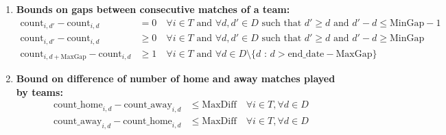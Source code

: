 \documentclass[a4paper, 12pt]{article}
\begin{document}
\begin{enumerate}
    \item \textbf{Bounds on gaps between consecutive matches of a team:}
    \begin{align*}
        \text{count}_{i,d'} - \text{count}_{i,d} &= 0 \quad \forall i \in T \text{ and } \forall d, d' \in D \text{ such that $d' \geq d$ and $d' - d \leq \text{MinGap}$} - 1 \\
        \text{count}_{i,d'} - \text{count}_{i,d} &\geq 0 \quad \forall i \in T \text{ and } \forall d, d' \in D \text{ such that $d' \geq d$ and $d' - d \geq \text{MinGap}$} \\
        \text{count}_{i,d+\text{MaxGap}} - \text{count}_{i,d} &\geq 1 \quad \forall i \in T \text{ and } \forall d \in D \setminus \{d \text{ : } d > \text{end\_date} - \text{MaxGap} \} 
    \end{align*}

    \item \textbf{Bound on difference of number of home and away matches played by teams:}
    \begin{align*}
        \text{count\_home}_{i,d} - \text{count\_away}_{i,d} &\leq \text{MaxDiff} \quad \forall i \in T , \forall d \in D \\
        \text{count\_away}_{i,d} - \text{count\_home}_{i,d} &\leq \text{MaxDiff} \quad \forall i \in T , \forall d \in D
    \end{align*}


\end{enumerate}
\end{document}
